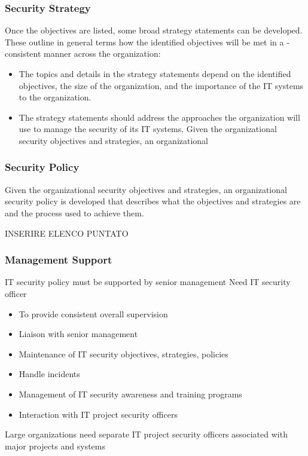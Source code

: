 \documentclass[xcolor ={table,usenames,dvipsnames}]{beamer}
\theoremstyle{definition}
\begin{document}
	\begin{frame}
		\frametitle{Security Strategy}
		Once the objectives are listed, some broad strategy statements can be developed.
		These outline in general terms how the identified objectives will be met in a ­consistent manner across the organization:
		\begin{itemize}
			 \item The topics and details in the strategy ­statements
			depend on the identified objectives, the size of the organization, and the importance of the IT systems to the organization. 
			\item The strategy statements should address the approaches the organization will use to manage the security of its IT systems. Given the organizational security objectives and strategies, an organizational
		\end{itemize}	
	\end{frame}

	\begin{frame}
		\frametitle{Security Policy}
		Given the organizational security objectives and strategies, an organizational
		security policy is developed that describes what the objectives and strategies are and the process used to achieve them. 
		
		INSERIRE ELENCO PUNTATO
	\end{frame}

	\begin{frame}
		\frametitle{Management Support }
		IT security policy must be supported by senior management
		Need IT security officer
		\begin{itemize}
			\item To provide consistent overall supervision
			\item Liaison with senior management
			\item Maintenance of IT security objectives, strategies, policies
			\item Handle incidents
			\item Management of IT security awareness and training programs
			\item Interaction with IT project security officers
		\end{itemize}
		Large organizations need separate IT project security officers associated with major projects and systems
	\end{frame}
\end{document}
